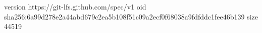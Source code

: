 version https://git-lfs.github.com/spec/v1
oid sha256:6a99d278e2a44abd679c2ea5b108f51c09a2ecf0f68038a9fdfddc1fee46b139
size 44519
